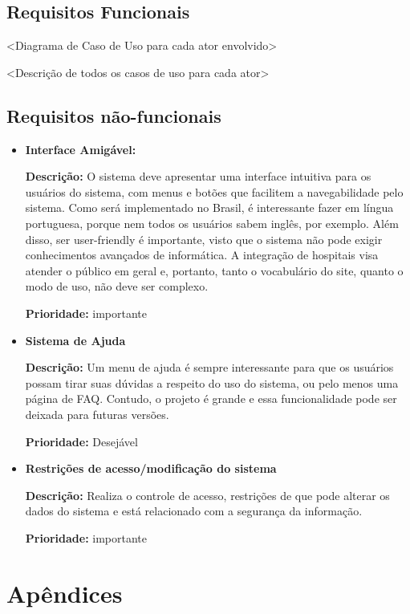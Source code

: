 \documentclass[12pt,a4paper]{report}
\begin{document}
\subsection{Requisitos Funcionais}

<Diagrama de Caso de Uso para cada ator envolvido>

<Descrição de todos os casos de uso para cada ator>


\subsection{Requisitos não-funcionais}

\begin{itemize}

\item \textbf{Interface Amigável:} 

\textbf{Descrição:} O sistema deve apresentar uma interface intuitiva para os usuários do sistema, com menus e botões que facilitem a navegabilidade pelo sistema.
Como será implementado no Brasil, é interessante fazer em língua portuguesa, porque nem todos os usuários sabem inglês, por exemplo.
Além disso, ser user-friendly é importante, visto que o sistema não pode exigir conhecimentos avançados de informática. A integração de hospitais visa atender o público em geral e, portanto, tanto o vocabulário do site, quanto o modo de uso, não deve ser complexo. 

\textbf{Prioridade:} importante


\item \textbf{Sistema de Ajuda} 

\textbf{Descrição:} Um menu de ajuda é sempre interessante para que os usuários possam tirar suas dúvidas a respeito do uso do sistema, ou pelo menos uma página de FAQ. Contudo, o projeto é grande e essa funcionalidade pode ser deixada para futuras versões. 

\textbf{Prioridade:} Desejável \newline


\item \textbf{Restrições de acesso/modificação do sistema}

\textbf{Descrição:} Realiza o controle de acesso, restrições de que pode alterar os dados do sistema e está relacionado com a segurança da informação.

\textbf{Prioridade:} importante

\end{itemize}

\section{Apêndices}
\end{document}

